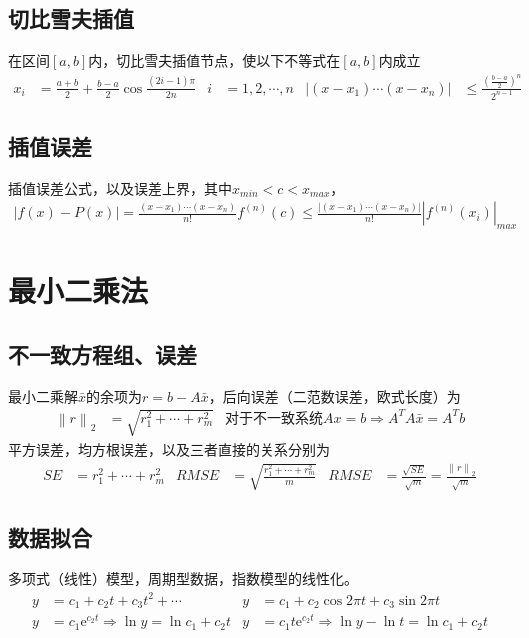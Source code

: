 \documentclass[twocolumn]{article}
\begin{document}
\subsection{切比雪夫插值}
在区间$[a,b]$内，切比雪夫插值节点，使以下不等式在$[a,b]$内成立
\begin{align*}
    x_i & =\frac{a+b}{2}+\frac{b-a}{2}\cos{\frac{(2i-1)\pi}{2n}} & i&=1,2,\cdots,n&    \left| (x-x_1)\cdots(x-x_n) \right|&\leqslant \frac{\left( \frac{b-a}{2} \right)^n}{2^{n-1}}
\end{align*}

\subsection{插值误差}
插值误差公式，以及误差上界，其中$x_{min}<c<x_{max}$，
\begin{align*}
    \left| f(x)-P(x) \right|=\frac{(x-x_1)\cdots(x-x_n)}{n!}f^{(n)}(c)  \leqslant\frac{\left| (x-x_1)\cdots(x-x_n) \right|}{n!}\left| f^{(n)}(x_i) \right|_{max}
\end{align*}

\section{最小二乘法}

\subsection{不一致方程组、误差}
最小二乘解$\bar{x}$的余项为$r=b-A\bar{x}$，后向误差（二范数误差，欧式长度）为
\begin{align*}
    \left\| r \right\|_2&=\sqrt{r_1^2+\cdots+r_m^2} &\text{对于不一致系统}Ax=b\Rightarrow A^TA\bar{x}=A^Tb
\end{align*}
平方误差，均方根误差，以及三者直接的关系分别为
\begin{align*}
    SE & =r_1^2+\cdots+r_m^2 & RMSE & =\sqrt{\frac{r_1^2+\cdots+r_m^2}{m}} & RMSE & =\frac{\sqrt{SE}}{\sqrt{m}}=\frac{\left\| r \right\|_2}{\sqrt{m}}
\end{align*}

\subsection{数据拟合}
多项式（线性）模型，周期型数据，指数模型的线性化。
\begin{align*}
    y & =c_1+c_2t+c_3t^2+\cdots                                & y & =c_1+c_2\cos{2\pi t}+c_3\sin{2\pi t}                           \\
    y & =c_1\mathrm{e}^{c_2t} \Rightarrow \ln{y}=\ln{c_1}+c_2t & y & =c_1t\mathrm{e}^{c_2t} \Rightarrow \ln{y}-\ln{t}=\ln{c_1}+c_2t
\end{align*}
\end{document}
